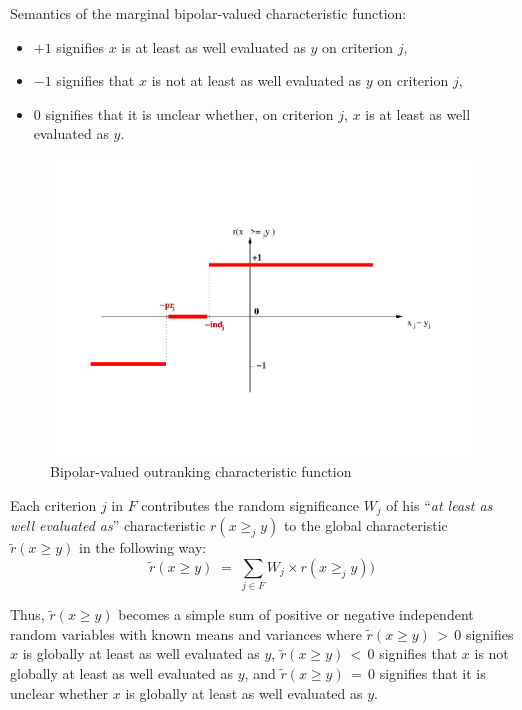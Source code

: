 Semantics of the marginal bipolar-valued characteristic function:
\begin{itemize}[topsep=1pt]
\item $+1$ signifies $x$ is at least as well evaluated as $y$ on criterion $j$,
\item $-1$ signifies that $x$ is not at least as well evaluated as $y$ on criterion $j$,
\item $0$ signifies that it is unclear whether, on criterion $j$, $x$ is at least as well evaluated as $y$.
\end{itemize}
\begin{figure}[ht]
\includegraphics[width=\hsize]{Figures/18-2-rCharacteristic.pdf}
\caption{Bipolar-valued outranking characteristic function}
\label{fig:18.2}       %
\end{figure}

Each criterion $j$ in $F$ contributes the random significance $W_j$ of his ``\emph{at least as well evaluated as}'' characteristic $r(x \geqslant_j y)$ to the global characteristic $\tilde{r}(x \geqslant y)$ in the following way:
\begin{equation}
      \tilde{r}(x \geqslant y) \; = \; \sum_{j \in F} W_j \times r(x \geqslant_j y) )
\end{equation}

Thus, $\tilde{r}(x \geqslant y)$ becomes a simple sum of positive or negative independent random variables with known means and variances where $\tilde{r}(x \geqslant y) \, > \, 0$ signifies $x$ is globally at least as well evaluated as $y$, $\tilde{r}(x \geqslant y) \, < \, 0$ signifies that $x$ is not globally at least as well evaluated as $y$, and $\tilde{r}(x \geqslant y)\,=\,0$ signifies that it is unclear whether $x$ is globally at least as well evaluated as $y$.

